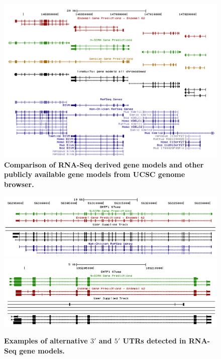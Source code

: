 \documentclass[10pt]{article}
\begin{document}
\begin{figure}[!ht]
\begin{center}
\includegraphics[width=5in]{figure10.png}
\end{center}
\caption{
{\bf Comparison of RNA-Seq derived gene models and other publicly available gene models from UCSC genome browser.}
}
\label{figure10}
\end{figure}


\begin{figure}[!ht]
\begin{center}
\includegraphics[width=5in]{figure11.png}
\includegraphics[width=5in]{figure12.png}
\end{center}
\caption{
{\bf Examples of alternative $3'$ and $5'$ UTRs detected in RNA-Seq gene models.}
}
\label{figure11}
\end{figure}
\end{document}
